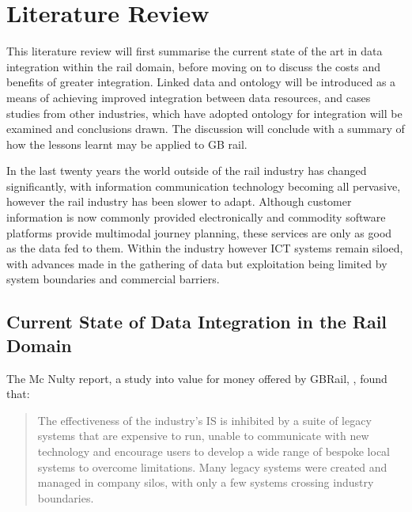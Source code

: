 \chapter{Literature Review}\label{ch:litreview}
This literature review will first summarise the current state of the art in data integration within the rail domain, before moving on to discuss the costs and benefits of greater integration. Linked data and ontology will be introduced as a means of achieving improved integration between data resources, and cases studies from other industries, which have adopted ontology for integration will be examined and conclusions drawn. The discussion will conclude with a summary of how the lessons learnt may be applied to GB rail.

In the last twenty years the world outside of the rail industry has changed significantly, with information communication technology becoming all pervasive, however the rail industry has been slower to adapt. Although customer information is now commonly provided electronically and commodity software platforms provide multimodal journey planning, these services are only as good as the data fed to them. Within the industry however ICT systems remain siloed, with advances made in the gathering of data but exploitation being limited by system boundaries and commercial barriers. 

\section{Current State of Data Integration in the Rail Domain}
\label{state}

The Mc Nulty report, a study into value for money offered by GBRail, \citep{DepartmentforTransport2011}, found that:
\begin{quote}
    The effectiveness of the industry’s IS is inhibited by a suite of legacy systems that are expensive to run, unable to communicate with new technology and encourage users to develop a wide range of bespoke local systems to overcome limitations. Many legacy systems were created and managed in company silos, with only a few systems crossing industry boundaries.
\end{quote}

